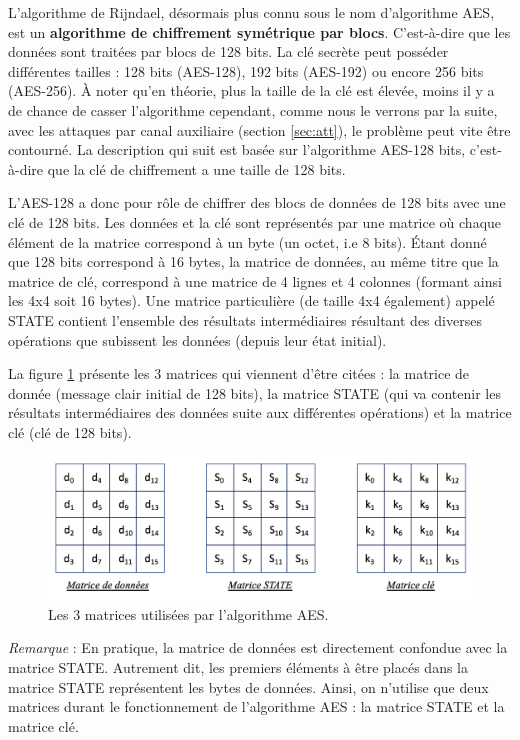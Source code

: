 \documentclass[10pt, oneside, a4paper]{article}
\begin{document}
L'algorithme de Rijndael, désormais plus connu sous le nom d'algorithme AES, est un \textbf{algorithme de chiffrement symétrique par blocs}. C'est-à-dire que les données sont traitées par blocs de 128 bits. La clé secrète peut posséder différentes tailles : 128 bits (AES-128), 192 bits (AES-192) ou encore 256 bits (AES-256). À noter qu'en théorie, plus la taille de la clé est élevée, moins il y a de chance de casser l'algorithme cependant,  comme nous le verrons par la suite, avec les attaques par canal auxiliaire (section \ref{sec:att}), le problème peut vite être contourné. La description qui suit est basée sur l'algorithme AES-128 bits, c'est-à-dire que la clé de chiffrement a une taille de 128 bits.

L'AES-128 a donc pour rôle de chiffrer des blocs de données de 128 bits avec une clé de 128 bits. Les données et la clé sont représentés par une matrice où chaque élément de la matrice correspond à un byte (un octet, i.e 8 bits). Étant donné que 128 bits correspond à 16 bytes, la matrice de données, au même titre que la matrice de clé, correspond à une matrice de 4 lignes et 4 colonnes (formant ainsi les 4x4 soit 16 bytes). Une matrice particulière (de taille 4x4 également) appelé STATE contient l'ensemble des résultats intermédiaires résultant des diverses opérations que subissent les données (depuis leur état initial). 

La figure \ref{fig:matrix} présente les 3 matrices qui viennent d'être citées : la matrice de donnée (message clair initial de 128 bits), la matrice STATE (qui va contenir les résultats intermédiaires des données suite aux différentes opérations) et la matrice clé (clé de 128 bits).
\begin{figure}[htbp]
    \centering
    \includegraphics[scale=0.75]{image/matrix}
    \caption{Les 3 matrices utilisées par l'algorithme AES.}
    \label{fig:matrix}
\end{figure}

\textit{Remarque} : En pratique, la matrice de données est directement confondue avec la matrice STATE. Autrement dit, les premiers éléments à être placés dans la matrice STATE représentent les bytes de données. Ainsi, on n'utilise que deux matrices durant le fonctionnement de l'algorithme AES : la matrice STATE et la matrice clé.
\end{document}
